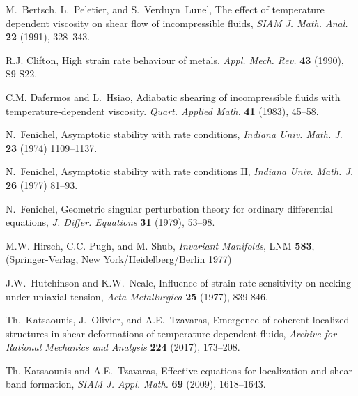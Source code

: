 \documentclass[a4paper,11pt]{article}
\theoremstyle{remark}
\begin{document}
\begin{thebibliography}{10}

{\sc M.~Bertsch, L.~Peletier, and S.~Verduyn~Lunel},
The effect of temperature dependent viscosity on shear flow of  incompressible fluids,
{\it SIAM J. Math. Anal.} {\bf 22 } (1991), 328--343.

{\sc R.J. Clifton},  High strain rate behaviour of metals,
{\it Appl. Mech. Rev.}
{\bf 43} (1990), S9-S22.

{\sc C.M. Dafermos and L.~Hsiao},
Adiabatic shearing of incompressible fluids with temperature-dependent viscosity.
{\it Quart.  Applied Math.} {\bf 41} (1983), 45--58.


{\sc N.~Fenichel},
Asymptotic stability with rate conditions,
{\it Indiana Univ. Math. J.} {\bf 23} (1974) 1109--1137.

{\sc N.~Fenichel},
Asymptotic stability with rate conditions \textrm{II},
{\it Indiana Univ. Math. J.} {\bf 26} (1977) 81--93.

{\sc N.~Fenichel},
Geometric singular perturbation theory for ordinary differential equations,
{\it J. Differ. Equations} {\bf 31} (1979), 53--98.


{\sc M.W. Hirsch, C.C. Pugh, and M. Shub},
{\it Invariant Manifolds}, LNM {\bf 583}, (Springer-Verlag, New York/Heidelberg/Berlin 1977)

{\sc J.W.~Hutchinson and K.W.~Neale},
Influence of strain-rate sensitivity on necking under uniaxial tension,
{\it  Acta Metallurgica} {\bf 25} (1977), 839-846.

{\sc Th.~Katsaounis, J.~Olivier, and A.E.~Tzavaras},
Emergence of coherent localized structures in shear deformations of temperature dependent fluids,
{\it Archive for Rational Mechanics and Analysis} {\bf 224} (2017), 173--208.

{\sc Th. Katsaounis and A.E.~Tzavaras},
Effective equations for localization and shear band formation,
{\it SIAM J. Appl. Math.}  {\bf 69} (2009), 1618--1643.


\end{thebibliography}
\end{document}
